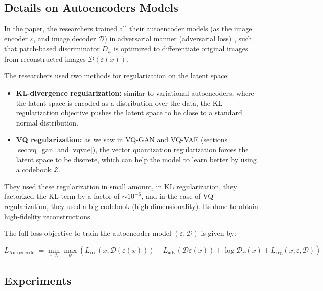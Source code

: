 \subsection{Details on Autoencoders Models}

In the paper, the researchers trained all their autoencoder models (as the image encoder $\varepsilon$, and image decoder $\mathcal{D}$) in adversarial manner (adversarial loss) \cite{vqgan}, such that patch-based discriminator $D_\psi$ is optimized to differentiate original images from reconstructed images $\mathcal{D} (\varepsilon (x))$.

The researchers used two methods for regularization on the latent space:

\begin{itemize}
    \item \textbf{KL-divergence regularization:} similar to variational autoencoders, where the latent space is encoded as a distribution over the data, the KL regularization objective pushes the latent space to be close to a standard normal distribution.
    \item \textbf{VQ regularization:} as we saw in VQ-GAN and VQ-VAE (sections \ref{sec:vq_gan} and \ref{vqvae}), the vector quantization regularization forces the latent space to be discrete, which can help the model to learn better by using a codebook $\mathcal{Z}$.
\end{itemize}

They used these regularization in small amount, in KL regularization, they factorized the KL term by a factor of $\sim 10^{-6}$, and in the case of VQ regularization, they used a big codebook (high dimensionality). Its done to obtain high-fidelity reconstructions.

The full loss objective to train the autoencoder model $(\varepsilon, \mathcal{D})$ is given by:

\begin{equation*}
    L_{\text{Autoencoder}} = \min_{\varepsilon, \mathcal{D}} \max_{\psi} \left( L_{\text{rec}} (x, \mathcal{D} (\varepsilon (x))) - L_{\text{adv}} (\mathcal{D} \varepsilon (x)) + \log \mathcal{D}_\psi (x) + L_{\text{reg}} (x; \varepsilon, \mathcal{D}) \right)
\end{equation*}





\subsection{Experiments}

